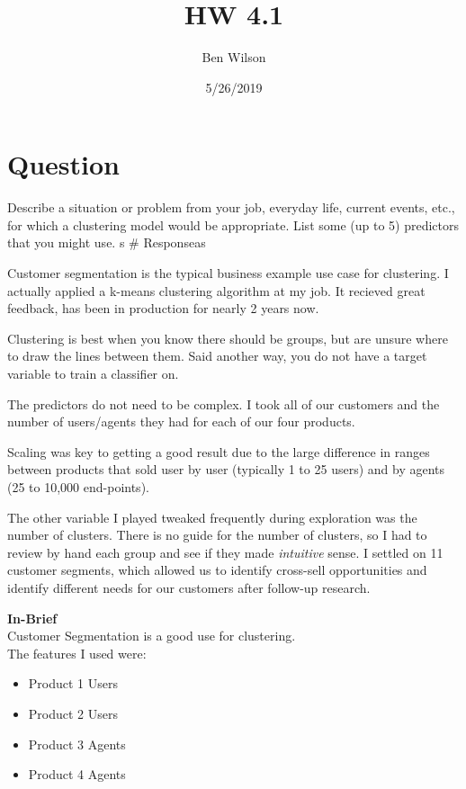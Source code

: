 \documentclass[]{article}
\title{HW 4.1}
\author{Ben Wilson}
\date{5/26/2019}
\providecommand{\tightlist}{%
  \setlength{\itemsep}{0pt}\setlength{\parskip}{0pt}}
\begin{document}
\maketitle

\section{Question}\label{question}

Describe a situation or problem from your job, everyday life, current
events, etc., for which a clustering model would be appropriate. List
some (up to 5) predictors that you might use. s \# Responseas

Customer segmentation is the typical business example use case for
clustering. I actually applied a k-means clustering algorithm at my job.
It recieved great feedback, has been in production for nearly 2 years
now.

Clustering is best when you know there should be groups, but are unsure
where to draw the lines between them. Said another way, you do not have
a target variable to train a classifier on.

The predictors do not need to be complex. I took all of our customers
and the number of users/agents they had for each of our four products.

Scaling was key to getting a good result due to the large difference in
ranges between products that sold user by user (typically 1 to 25 users)
and by agents (25 to 10,000 end-points).

The other variable I played tweaked frequently during exploration was
the number of clusters. There is no guide for the number of clusters, so
I had to review by hand each group and see if they made \emph{intuitive}
sense. I settled on 11 customer segments, which allowed us to identify
cross-sell opportunities and identify different needs for our customers
after follow-up research.

\textbf{In-Brief}\\
Customer Segmentation is a good use for clustering.\\
The features I used were:

\begin{itemize}
\tightlist
\item
  Product 1 Users
\item
  Product 2 Users
\item
  Product 3 Agents
\item
  Product 4 Agents
\end{itemize}
\end{document}
